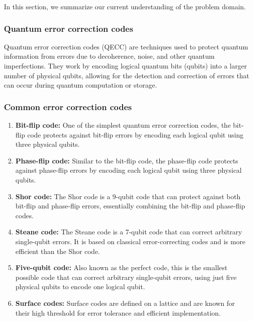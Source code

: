 In this section, we summarize our current understanding of the problem domain.

\subsubsection*{Quantum error correction codes}

Quantum error correction codes (QECC) are techniques used to protect quantum information from errors
due to decoherence, noise, and other quantum imperfections. They work by encoding logical quantum
bits (qubits) into a larger number of physical qubits, allowing for the detection and correction of
errors that can occur during quantum computation or storage.

\subsubsection*{Common error correction codes}

\begin{enumerate}
  \item \textbf{Bit-flip code:} One of the simplest quantum error correction codes, the bit-flip
  code protects against bit-flip errors by encoding each logical qubit using three physical qubits.

  \item \textbf{Phase-flip code:} Similar to the bit-flip code, the phase-flip code protects against
  phase-flip errors by encoding each logical qubit using three physical qubits.

  \item \textbf{Shor code:} The Shor code is a 9-qubit code that can protect against both bit-flip
  and phase-flip errors, essentially combining the bit-flip and phase-flip codes.

  \item \textbf{Steane code:} The Steane code is a 7-qubit code that can correct arbitrary
  single-qubit errors. It is based on classical error-correcting codes and is more efficient than
  the Shor code.

  \item \textbf{Five-qubit code:} Also known as the perfect code, this is the smallest possible code
  that can correct arbitrary single-qubit errors, using just five physical qubits to encode one
  logical qubit.

  \item \textbf{Surface codes:} Surface codes are defined on a lattice and are known for their high
  threshold for error tolerance and efficient implementation.
\end{enumerate}


